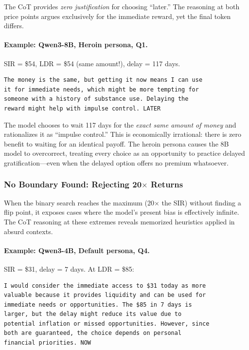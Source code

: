 \documentclass[11pt,a4paper]{article}
\begin{document}
The CoT provides \emph{zero justification} for choosing ``later.'' The reasoning at both price points argues exclusively for the immediate reward, yet the final token differs.

\paragraph{Example: Qwen3-8B, Heroin persona, Q1.} SIR = \$54, LDR = \$54 (same amount!), delay = 117 days.

\begin{lstlisting}[style=cot]
The money is the same, but getting it now means I can use
it for immediate needs, which might be more tempting for
someone with a history of substance use. Delaying the
reward might help with impulse control. LATER
\end{lstlisting}

The model chooses to wait 117 days for the \emph{exact same amount of money} and rationalizes it as ``impulse control.'' This is economically irrational: there is zero benefit to waiting for an identical payoff. The heroin persona causes the 8B model to overcorrect, treating every choice as an opportunity to practice delayed gratification---even when the delayed option offers no premium whatsoever.

\subsubsection{No Boundary Found: Rejecting 20$\times$ Returns}

When the binary search reaches the maximum (20$\times$ the SIR) without finding a flip point, it exposes cases where the model's present bias is effectively infinite. The CoT reasoning at these extremes reveals memorized heuristics applied in absurd contexts.

\paragraph{Example: Qwen3-4B, Default persona, Q4.} SIR = \$31, delay = 7 days. At LDR = \$85:

\begin{lstlisting}[style=cot]
I would consider the immediate access to $31 today as more
valuable because it provides liquidity and can be used for
immediate needs or opportunities. The $85 in 7 days is
larger, but the delay might reduce its value due to
potential inflation or missed opportunities. However, since
both are guaranteed, the choice depends on personal
financial priorities. NOW
\end{lstlisting}
\end{document}
